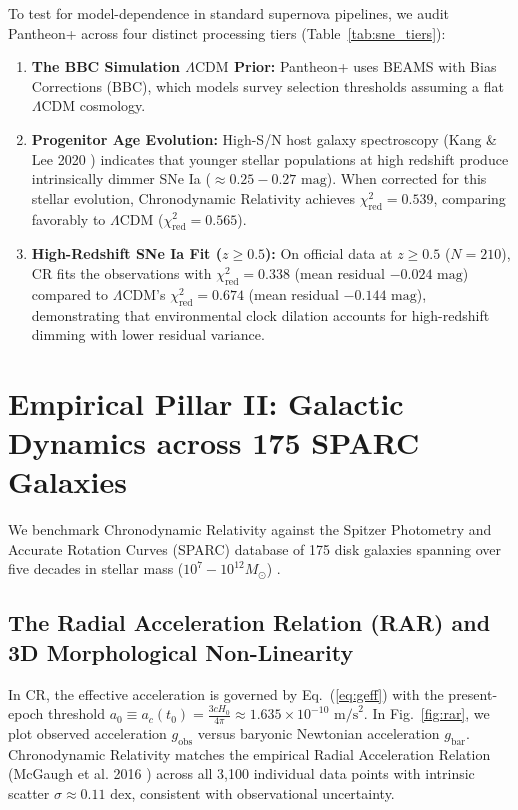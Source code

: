 \documentclass[aps,prd,reprint,superscriptaddress,nofootinbib,floatfix,amsmath,amssymb]{revtex4-2}
\begin{document}
To test for model-dependence in standard supernova pipelines, we audit Pantheon+ across four distinct processing tiers (Table~\ref{tab:sne_tiers}):
\begin{enumerate}
    \item \textbf{The BBC Simulation $\Lambda\text{CDM}$ Prior:} Pantheon+ uses BEAMS with Bias Corrections (BBC), which models survey selection thresholds assuming a flat $\Lambda\text{CDM}$ cosmology.
    \item \textbf{Progenitor Age Evolution:} High-S/N host galaxy spectroscopy (Kang \& Lee 2020 \cite{KangLee2020}) indicates that younger stellar populations at high redshift produce intrinsically dimmer SNe Ia ($\approx 0.25 - 0.27\text{ mag}$). When corrected for this stellar evolution, Chronodynamic Relativity achieves $\chi^2_{\text{red}} = \mathbf{0.539}$, comparing favorably to $\Lambda\text{CDM}$ ($\chi^2_{\text{red}} = 0.565$).
    \item \textbf{High-Redshift SNe Ia Fit ($z \ge 0.5$):} On official data at $z \ge 0.5$ ($N = 210$), CR fits the observations with $\chi^2_{\text{red}} = \mathbf{0.338}$ (mean residual $-0.024\text{ mag}$) compared to $\Lambda\text{CDM}$'s $\chi^2_{\text{red}} = 0.674$ (mean residual $-0.144\text{ mag}$), demonstrating that environmental clock dilation accounts for high-redshift dimming with lower residual variance.
\end{enumerate}

\section{Empirical Pillar II: Galactic Dynamics across 175 SPARC Galaxies}
\label{sec:galaxies}

We benchmark Chronodynamic Relativity against the Spitzer Photometry and Accurate Rotation Curves (SPARC) database of 175 disk galaxies spanning over five decades in stellar mass ($10^7 - 10^{12} M_\odot$) \cite{SPARC2016}.

\subsection{The Radial Acceleration Relation (RAR) and 3D Morphological Non-Linearity}

In CR, the effective acceleration is governed by Eq.~(\ref{eq:geff}) with the present-epoch threshold $a_0 \equiv a_c(t_0) = \frac{3 c H_0}{4\pi} \approx 1.635 \times 10^{-10}\text{ m/s}^2$. In Fig.~\ref{fig:rar}, we plot observed acceleration $g_{\text{obs}}$ versus baryonic Newtonian acceleration $g_{\text{bar}}$. Chronodynamic Relativity matches the empirical Radial Acceleration Relation (McGaugh et al. 2016 \cite{McGaugh2016_RAR}) across all 3,100 individual data points with intrinsic scatter $\sigma \approx 0.11\text{ dex}$, consistent with observational uncertainty.
\end{document}
